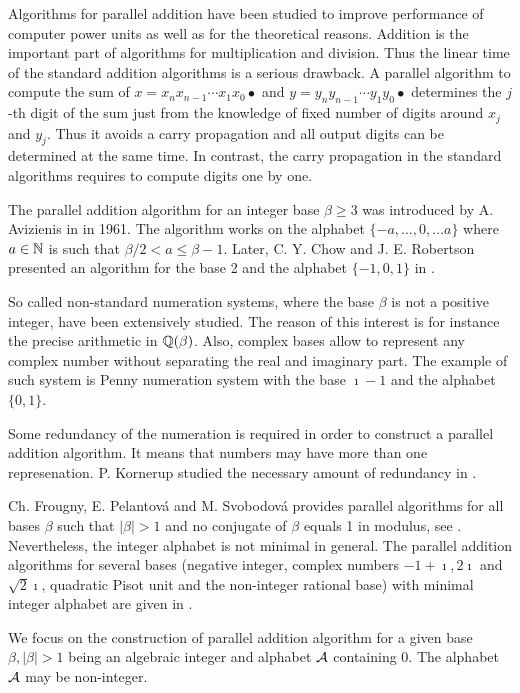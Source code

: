 Algorithms for parallel addition have been studied to improve performance of computer power units as well as for the theoretical reasons. Addition is the important part of algorithms for multiplication and division. Thus the linear time of the standard addition algorithms is a serious drawback. A parallel algorithm to compute the sum of $x=x_n x_{n-1}\cdots x_1 x_0 \bullet$ and $y=y_n y_{n-1}\cdots y_1 y_0 \bullet$ determines the $j$-th digit of the sum just from the knowledge of fixed number of digits around $x_j$ and $y_j$. Thus it avoids a carry propagation and all output digits can be determined at the same time. In contrast, the carry propagation in the standard algorithms requires to compute digits one by one.

The parallel addition algorithm for an integer base $\beta\geq3$ was introduced by A. Avizienis in \cite{avizienis} in 1961. The algorithm works on the alphabet $\{-a, \dots, 0, \dots a\}$ where $a\in\mathbb{N}$ is such that $\beta/2 <a \leq \beta-1$. Later, C. Y. Chow and J. E. Robertson presented an algorithm for the base 2 and the alphabet $\{-1,0,1\}$ in \cite{chow}.   

So called non-standard numeration systems, where the base $\beta$ is not a positive integer, have been extensively studied. The reason of this interest is for instance the precise arithmetic in $\mathbb{Q}(\beta)$. Also, complex bases allow to represent any complex number without separating the real and imaginary part. The example of such system is Penny numeration system with the base $\imath -1$ and the alphabet $\{0,1\}$.

Some redundancy of the numeration is required in order to construct a parallel addition algorithm. It means that numbers may have more than one represenation. P. Kornerup studied the necessary amount of redundancy in \cite{kornerup}. 

Ch. Frougny, E. Pelantov\'a and M. Svobodov\'a provides parallel algorithms for all bases $\beta$ such that $|\beta|>1$ and no conjugate of $\beta$ equals 1 in modulus, see \cite{parAddNS}. Nevertheless, the integer alphabet is not minimal in general.
 The parallel addition algorithms for several bases (negative integer, complex numbers $-1+\imath, 2\imath$ and $\sqrt{2}\imath$, quadratic Pisot unit and the non-integer rational base) with minimal integer alphabet are given in \cite{minAlph}.
 

We focus on the construction of parallel addition algorithm for a given base $\beta, |\beta|>1$ being an algebraic integer and alphabet $\mathcal{A}$ containing 0. The alphabet $\mathcal{A}$ may be non-integer. 


